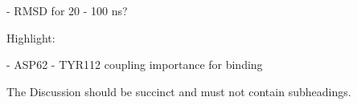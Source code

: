 \documentclass[fleqn,10pt]{wlscirep}
\begin{document}
     - RMSD for 20 - 100 ns?

Highlight:

  - ASP62 - TYR112 coupling importance for binding

The Discussion should be succinct and must not contain subheadings.



%







\end{document}
